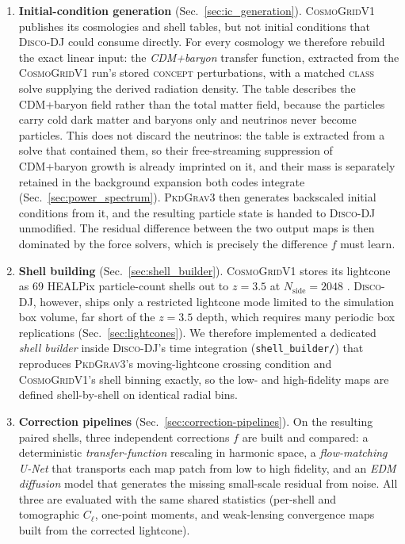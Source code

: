 \documentclass{report}
\begin{document}
\begin{enumerate}
  \item \textbf{Initial-condition generation} (Sec.~\ref{sec:ic_generation}). \textsc{CosmoGridV1} publishes its cosmologies and shell tables, but not initial conditions that \textsc{Disco-DJ} could consume directly. For every cosmology we therefore rebuild the exact linear input: the \emph{CDM+baryon} transfer function, extracted from the \textsc{CosmoGridV1} run's stored \textsc{concept} perturbations, with a matched \textsc{class} solve supplying the derived radiation density. The table describes the CDM+baryon field rather than the total matter field, because the particles carry cold dark matter and baryons only and neutrinos never become particles. This does not discard the neutrinos: the table is extracted from a solve that contained them, so their free-streaming suppression of CDM+baryon growth is already imprinted on it, and their mass is separately retained in the background expansion both codes integrate (Sec.~\ref{sec:power_spectrum}). \textsc{PkdGrav3} then generates backscaled initial conditions from it, and the resulting particle state is handed to \textsc{Disco-DJ} unmodified. The residual difference between the two output maps is then dominated by the force solvers, which is precisely the difference \mbox{$f$} must learn.
  \item \textbf{Shell building} (Sec.~\ref{sec:shell_builder}). \textsc{CosmoGridV1} stores its lightcone as 69 HEALPix particle-count shells out to $z=3.5$ at $N_{\mathrm{side}}=2048$ \cite{kacprzak_cosmogridv1_2023}. \textsc{Disco-DJ}, however, ships only a restricted lightcone mode limited to the simulation box volume, far short of the \mbox{$z=3.5$} depth, which requires many periodic box replications (Sec.~\ref{sec:lightcones}). We therefore implemented a dedicated \emph{shell builder} inside \textsc{Disco-DJ}'s time integration (\texttt{shell\_builder/}) that reproduces \textsc{PkdGrav3}'s moving-lightcone crossing condition and \textsc{CosmoGridV1}'s shell binning exactly, so the low- and high-fidelity maps are defined shell-by-shell on identical radial bins.
  \item \textbf{Correction pipelines} (Sec.~\ref{sec:correction-pipelines}). On the resulting paired shells, three independent corrections $f$ are built and compared: a deterministic \emph{transfer-function} rescaling in harmonic space, a \emph{flow-matching U-Net} that transports each map patch from low to high fidelity, and an \emph{EDM diffusion} model that generates the missing small-scale residual from noise. All three are evaluated with the same shared statistics (per-shell and tomographic $C_\ell$, one-point moments, and weak-lensing convergence maps built from the corrected lightcone).
\end{enumerate}
\end{document}
